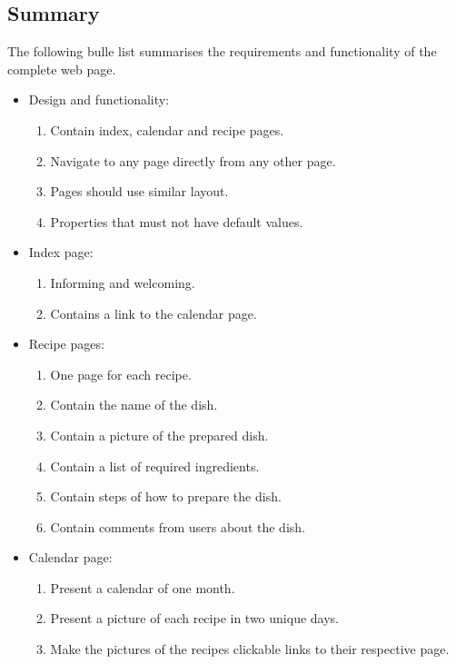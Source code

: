 \documentclass[a4paper]{scrartcl}
\begin{document}
\subsection{Summary}
The following bulle list summarises the requirements and functionality of the complete web page.
\begin{itemize}

    \item Design and functionality:
        \begin{enumerate}
            \item Contain index, calendar and recipe pages.
            \item Navigate to any page directly from any other page.
            \item Pages should use similar layout.
            \item Properties that must not have default values.
        \end{enumerate}

    \item Index page:
        \begin{enumerate}
            \item Informing and welcoming.
            \item Contains a link to the calendar page.
        \end{enumerate}

    \item Recipe pages:
        \begin{enumerate}
            \item One page for each recipe.
            \item Contain the name of the dish.
            \item Contain a picture of the prepared dish.
            \item Contain a list of required ingredients.
            \item Contain steps of how to prepare the dish.
            \item Contain comments from users about the dish. 
        \end{enumerate}

    \item Calendar page:
        \begin{enumerate}
            \item Present a calendar of one month.
            \item Present a picture of each recipe in two unique days.
            \item Make the pictures of the recipes clickable links to their respective page.
        \end{enumerate}


\end{itemize}
\end{document}
